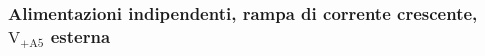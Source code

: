 % 
%
%

%
%

\subsubsection{Alimentazioni indipendenti, rampa di corrente crescente, $\mathrm{V_{+A5}}$ esterna} 


